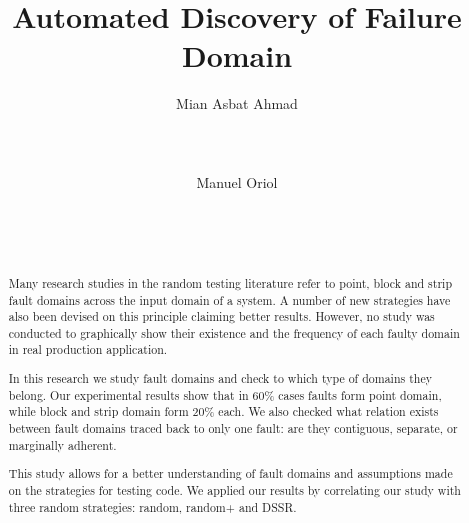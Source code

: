 \documentclass{acm_proc_article-sp}
\begin{document}
\title{Automated Discovery of Failure Domain}

%
\author{
%
%
\alignauthor
Mian Asbat Ahmad\\
       \\
       \\
       \\
\alignauthor
Manuel Oriol \\
       \\
       \\
       \\
}


\maketitle
\begin{abstract}
Many research studies in the random testing literature refer to 
point, block and strip fault domains across the input domain of a system.
A number of new strategies have also been devised on this principle claiming better results.
However, no study was conducted to graphically show their existence
and the frequency of each faulty domain in real production application. 

In this research we study fault domains and check to which type of domains they belong. 
Our experimental results show that in 60\%  cases faults form point domain, 
while block and strip domain form 20\% each. We also checked what relation exists 
between fault domains traced back to only one fault: are they contiguous, separate, or marginally adherent. 

This study allows for a better understanding of fault domains and assumptions made on the 
strategies for testing code. We applied our results by correlating our study with three random strategies: random, random+ and DSSR. 

\end{abstract}
\end{document}
